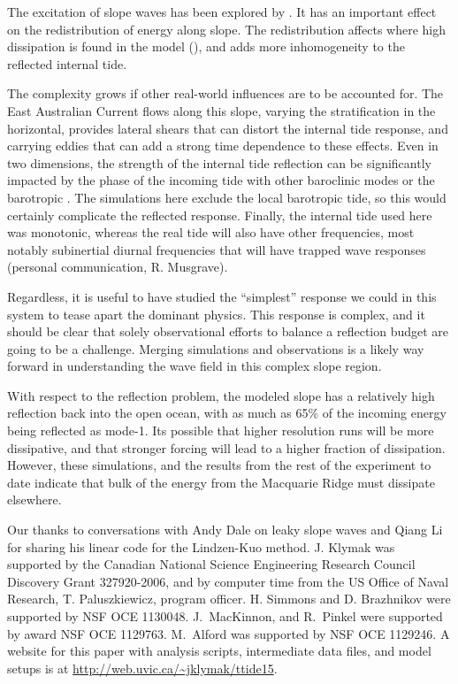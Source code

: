 \documentclass[10pt]{article}
\begin{document}
The excitation of slope waves has been explored by \citet{daleetal01}. It has an important effect on the redistribution of energy along slope.  The redistribution affects where high dissipation is found in the model (), and adds more inhomogeneity to the reflected internal tide.    

The complexity grows if other real-world influences are to be accounted for.  The East Australian Current flows along this slope, varying the stratification in the horizontal, provides lateral shears that can distort the internal tide response, and carrying eddies that can add a strong time dependence to these effects.  Even in two dimensions, the strength of the  internal tide reflection can be significantly impacted by the phase of the incoming tide with other baroclinic modes \citet{klymaketal11a} or the barotropic \citep{kellynash10}.
The simulations here exclude the local barotropic tide, so this would certainly complicate the reflected response.  Finally, the internal tide used here was monotonic, whereas the real tide will also have other frequencies, most notably subinertial diurnal frequencies that will have trapped wave responses (personal communication, R. Musgrave).  

Regardless, it is useful to have studied the ``simplest'' response we could in this system to tease apart the dominant physics.  This response is complex, and it should be clear that solely observational efforts to balance a reflection budget are going to be a challenge.  Merging simulations and observations is a likely way forward in understanding the wave field in this complex slope region.

With respect to the reflection problem, the modeled slope has a relatively high reflection back into the open ocean, with as much as 65\% of the incoming energy being reflected as mode-1.  Its possible that higher resolution runs will be more dissipative, and that stronger forcing will lead to a higher fraction of dissipation.  However, these simulations, and the results from the rest of the experiment to date \citep[i.e.][]{johnstonetal15} indicate that bulk of the energy from the Macquarie Ridge must dissipate elsewhere.  

\begin{acknowledgment} 
Our thanks to conversations with Andy Dale on leaky slope waves and Qiang Li for sharing his linear code for the Lindzen-Kuo method.  
J. Klymak was supported by the Canadian National Science Engineering Research Council Discovery Grant 327920-2006, and by computer time from the US Office of Naval Research, T. Paluszkiewicz, program officer.  H. Simmons and D. Brazhnikov were supported by NSF OCE 1130048.  J.\ MacKinnon, and R.\ Pinkel were supported by award  NSF OCE 1129763. M.\ Alford was supported by NSF OCE 1129246.
 A website for this paper with analysis scripts, intermediate data files, and model setups is at \url{http://web.uvic.ca/~jklymak/ttide15}.  

\end{acknowledgment}
\end{document}
